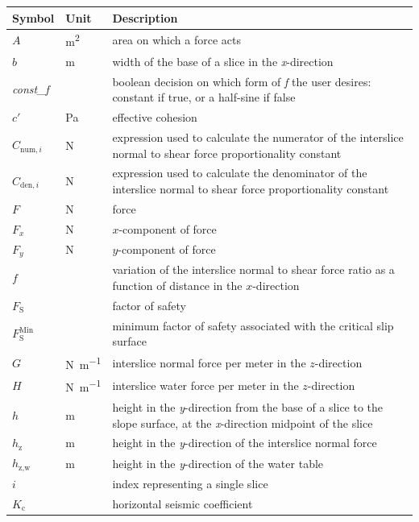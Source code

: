 \documentclass[12pt]{article}
\renewcommand{\arraystretch}{1}
\begin{document}
\renewcommand{\arraystretch}{1.6}
\setlength{\tabcolsep}{20pt}
\begin{longtable*}{  l  l  p{8.5cm}  }
\hline
\textbf{Symbol} & \textbf{Unit} & \textbf{Description} \\
\hline
$A$ & \si{\meter\squared}& area on which a force acts
\\
$b$ & \si{\meter}& width of the base of a slice in the \textit{x}-direction
\\
\textit{const\_f} & & boolean decision on which form of \textit{f} 
the user desires: constant if true, or a half-sine if false
\\
$c'$ & \si{\pascal} & effective cohesion 
\\
${C_{\text{num},i}}$ & \si{\newton}& expression used to calculate the numerator 
of the interslice normal to shear force proportionality constant
\\
${C_{\text{den},i}}$ & \si{\newton}& expression used to calculate the 
denominator of the interslice normal to shear force proportionality constant
\\
$F$ & \si{\newton}& force
\\
${F_{x}}$ & \si{\newton} & $x$-component of force
\\
${F_{y}}$ & \si{\newton} & $y$-component of force
\\
$f$ & & variation of the interslice normal to shear force ratio as a function 
of distance in the $x$-direction
\\
$F_\text{S}$ & & factor of safety
\\
$F_\text{S}^{\text{Min}}$ & & minimum factor of safety associated with the 
critical slip surface
\\
$G$ & \si{\newton\per\meter} & interslice normal force per meter in the 
$z$-direction
\\
$H$ & \si{\newton\per\meter} & interslice water force per meter in the 
$z$-direction
\\
$h$ &  \si{\meter}& height in the \textit{y}-direction from the base of a slice 
to the slope surface, at the \textit{x}-direction midpoint of the slice
\\
$h_{\text{z}}$ & \si{\meter}& height in the \textit{y}-direction of the 
interslice normal force
\\
$h_\text{z,w}$ & \si{\meter}& height in the \textit{y}-direction of the water 
table
\\ 
$i$ & & index representing a single slice 
\\
${K_{\text{c}}}$ & & horizontal seismic coefficient
\\

\end{longtable*}
\end{document}
